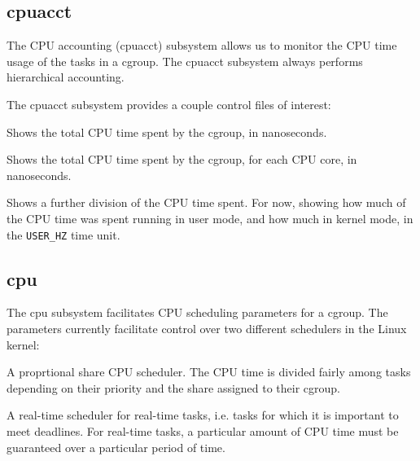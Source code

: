 \subsection{cpuacct}

The CPU accounting (cpuacct) subsystem allows us to monitor the CPU time usage
of the tasks in a cgroup\cite{cpuacct.txt}. The cpuacct subsystem always
performs hierarchical accounting.

The cpuacct subsystem provides a couple control files of interest:

\begin{description}[\setleftmargin{0.2in}\breaklabel\setlabelstyle{\tt}]

\item[cpuacct.usage] Shows the total CPU time spent by the cgroup, in
nanoseconds.

\item[cpuacct.usage\_percpu] Shows the total CPU time spent by the cgroup, for
each CPU core, in nanoseconds.

\item[cpuacct.stat] Shows a further division of the CPU time spent. For now,
showing how much of the CPU time was spent running in user mode, and how much
in kernel mode, in the \texttt{USER\_HZ} time unit.

\end{description}

\subsection{cpu}

The cpu subsystem facilitates CPU scheduling parameters for a
cgroup\cite{sched-design-cfs.txt,sched-bwc.txt,sched-rt-group.txt}. The
parameters currently facilitate control over two different schedulers in the
Linux kernel:

\begin{description}[\setleftmargin{0.2in}\breaklabel\setlabelstyle{\it}]

\item[Completely Fair Scheduler (CFS)] A proprtional share CPU scheduler. The
CPU time is divided fairly among tasks depending on their priority
and the share assigned to their cgroup.

\item[Real-Time Scheduler (RT)] A real-time scheduler for real-time tasks, i.e.
tasks for which it is important to meet deadlines. For real-time tasks, a
particular amount of CPU time must be guaranteed over a particular period of
time.

\end{description}

